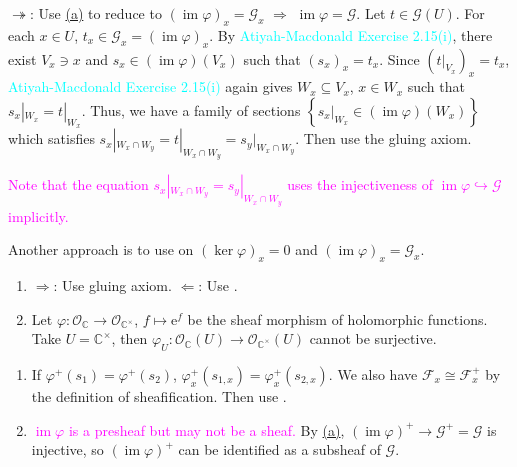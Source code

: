 \begin{exercise}
\begin{enumerate}[label=(\alph*),ref=\theexercise(\alph*)]
		$\twoheadrightarrow$: Use \hyperref[ex1.2.1]{(a)} to reduce to $(\operatorname{im}\varphi)_x=\mathcal{G}_x$ $\Rightarrow$ $\operatorname{im}\varphi=\mathcal{G}$. Let $t\in\mathcal{G}(U)$. For each $x\in U$, $t_x\in\mathcal{G}_x=(\operatorname{im}\varphi)_x$. By \textcolor{cyan}{Atiyah-Macdonald Exercise 2.15(i)}, there exist $V_x\ni x$ and $s_x\in(\operatorname{im}\varphi)\!\left(V_x\right)$ such that $\left(s_x\right)_x=t_x$. Since $\left(t|_{V_x}\right)_x=t_x$, \textcolor{cyan}{Atiyah-Macdonald Exercise 2.15(i)} again gives $W_x\subseteq V_x$, $x\in W_x$ such that $s_x|_{W_x}=t|_{W_x}$. Thus, we have a family of sections $\left\{s_x|_{W_x}\in(\operatorname{im}\varphi)\!\left(W_x\right)\right\}$ which satisfies $s_x|_{W_x\cap W_y}=t|_{W_x\cap W_y}=s_y|_{W_x\cap W_y}$. Then use the gluing axiom.
		
		\textcolor{magenta}{Note that the equation $s_x|_{W_x\cap W_y}=s_y|_{W_x\cap W_y}$ uses the injectiveness of $\operatorname{im}\varphi\hookrightarrow\mathcal{G}$ implicitly.}
		
		\textcolor{green!70!black}{Another approach is to use  on $(\ker\varphi)_x=0$ and $(\operatorname{im}\varphi)_x=\mathcal{G}_x$.}
	\end{enumerate}
\end{exercise}

\begin{exercise}\label{ex1.3}
	\begin{enumerate}[label=(\alph*),ref=\theexercise(\alph*)]
		\item\label{ex1.3.1} $\Rightarrow$: Use gluing axiom. $\Leftarrow$: Use .
		\item\label{ex1.3.2} Let $\varphi:\mathcal{O}_\mathbb{C}\rightarrow\mathcal{O}_{\mathbb{C}^\times}$, $f\mapsto\mathrm{e}^f$ be the sheaf morphism of holomorphic functions. Take $U=\mathbb{C}^\times$, then $\varphi_U:\mathcal{O}_\mathbb{C}(U)\rightarrow\mathcal{O}_{\mathbb{C}^\times}(U)$ cannot be surjective.
	\end{enumerate}
\end{exercise}

\begin{exercise}\label{ex1.4}
	\begin{enumerate}[label=(\alph*),ref=\theexercise(\alph*)]
		\item\label{ex1.4.1} If $\varphi^+\!\left(s_1\right)=\varphi^+\!\left(s_2\right)$, $\varphi_x^+\!\left(s_{1,x}\right)=\varphi_x^+\!\left(s_{2,x}\right)$. We also have $\mathcal{F}_x\cong\mathcal{F}_x^+$ by the definition of sheafification. Then use .
		\item \textcolor{magenta}{$\operatorname{im}\varphi$ is a presheaf but may not be a sheaf.} By \hyperref[ex1.4.1]{(a)}, $(\operatorname{im}\varphi)^+\rightarrow\mathcal{G}^+=\mathcal{G}$ is injective, so $(\operatorname{im}\varphi)^+$ can be identified as a subsheaf of $\mathcal{G}$.
	\end{enumerate}
\end{exercise}

